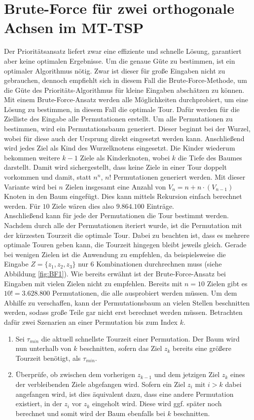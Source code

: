 \documentclass[german,version-2019-11]{uzl-thesis}
\begin{document}
\section{Brute-Force für zwei orthogonale Achsen im MT-TSP}

Der Prioritätsansatz liefert zwar eine effiziente und schnelle Lösung, garantiert aber keine optimalen Ergebnisse. Um die genaue Güte zu bestimmen, ist ein optimaler Algorithmus nötig. Zwar ist dieser für große Eingaben nicht zu gebrauchen, dennoch empfiehlt sich in diesem Fall die Brute-Force-Methode, um die Güte des Prioritäts-Algorithmus für kleine Eingaben abschätzen zu können. \\
Mit einem Brute-Force-Ansatz werden alle Möglichkeiten durchprobiert, um eine Lösung zu bestimmen, in diesem Fall die optimale Tour. Dafür werden für die Zielliste des Eingabe alle Permutationen erstellt. Um alle Permutationen zu bestimmen, wird ein Permutationsbaum generiert. Dieser beginnt bei der Wurzel, wobei für diese auch der Ursprung direkt eingesetzt werden kann. Anschließend wird jedes Ziel als Kind des Wurzelknotens eingesetzt. Die Kinder wiederum bekommen weitere $k-1$ Ziele als Kinderknoten, wobei $k$ die Tiefe des Baumes darstellt. Damit wird sichergestellt, dass keine Ziele in einer Tour doppelt vorkommen und damit, statt $n^n$, $n!$ Permutationen generiert werden. Mit dieser Variante wird bei $n$ Zielen insgesamt eine Anzahl von $V_n = n + n\cdot (V_{n-1})$ Knoten in den Baum eingefügt. Dies kann mittels Rekursion einfach berechnet werden. Für $10$ Ziele wären dies also $9.864.100$ Einträge.\\
Anschließend kann für jede der Permutationen die Tour bestimmt werden. Nachdem durch alle der Permutationen iteriert wurde, ist die Permutation mit der kürzesten Tourzeit die optimale Tour. Dabei zu beachten ist, dass es mehrere optimale Touren geben kann, die Tourzeit hingegen bleibt jeweils gleich. Gerade bei wenigen Zielen ist die Anwendung zu empfehlen, da beispielsweise die Eingabe $Z=\{z_1, z_2, z_3\}$ nur 6 Kombinationen durchrechnen muss (siehe Abbildung \ref{fig:BF1}). Wie bereits erwähnt ist der Brute-Force-Ansatz bei Eingaben mit vielen Zielen nicht zu empfehlen. Bereits mit $n=10$ Zielen gibt es $10! = 3.628.800$ Permutationen, die alle ausprobiert werden müssen. Um dem Abhilfe zu verschaffen, kann der Permutationsbaum an vielen Stellen beschnitten werden, sodass große Teile gar nicht erst berechnet werden müssen. Betrachten dafür zwei Szenarien an einer Permutation bis zum Index $k$.
\begin{enumerate}
\item
Sei $\tau_{min}$ die aktuell schnellste Tourzeit einer Permutation. Der Baum wird nun unterhalb von $k$ beschnitten, sofern das Ziel $z_k$ bereits eine größere Tourzeit benötigt, als $\tau_{min}$. 

\item
Überprüfe, ob zwischen dem vorherigen $z_{k-1}$ und dem jetzigen Ziel $z_{k}$ eines der verbleibenden Ziele abgefangen wird. Sofern ein Ziel $z_{i} \text{ mit } i>k$ dabei angefangen wird, ist dies äquivalent dazu, dass eine andere Permutation existiert, in der $z_i$ vor $z_k$ eingeholt wird. Diese wird ggf. später noch berechnet und somit wird der Baum ebenfalls bei $k$ beschnitten.
\end{enumerate} 
\end{document}
